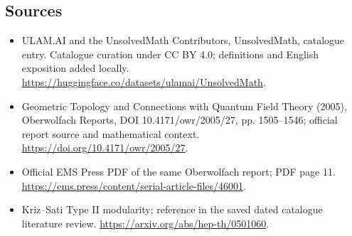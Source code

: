 \documentclass[11pt]{article}
\begin{document}
\subsection{Sources}
\begin{itemize}
\item[\hypertarget{source:statement:1}{S1}] ULAM.AI and the UnsolvedMath Contributors, UnsolvedMath, catalogue entry. Catalogue curation under CC BY 4.0; definitions and English exposition added locally.
\url{https://huggingface.co/datasets/ulamai/UnsolvedMath}.
\item[\hypertarget{source:statement:2}{S2}] Geometric Topology and Connections with Quantum Field Theory (2005), Oberwolfach Reports, DOI 10.4171/owr/2005/27, pp. 1505--1546; official report source and mathematical context.
\url{https://doi.org/10.4171/owr/2005/27}.
\item[\hypertarget{source:statement:3}{S3}] Official EMS Press PDF of the same Oberwolfach report; PDF page 11.
\url{https://ems.press/content/serial-article-files/46001}.
\item[\hypertarget{source:statement:4}{S4}] Kriz--Sati Type II modularity; reference in the saved dated catalogue literature review.
\url{https://arxiv.org/abs/hep-th/0501060}.
\end{itemize}
\label{end:statement}
\end{document}
